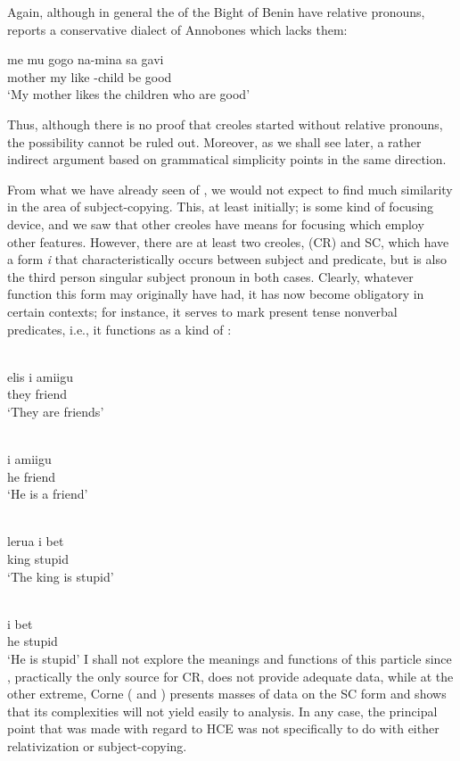 Again, although in general the  of the Bight of Benin have relative pronouns, \citet[97]{Valkoff1966} reports a conserva\-tive dialect of Annobones which lacks them:

\ea\label{ex:2:43}
\gll  me mu gogo na-mina sa gavi \\
mother my like {\PL}-child be good\\
\glt `My mother likes the children who are good'
\z

Thus, although there is no proof that creoles started without relative pronouns, the possibility cannot be ruled out. Moreover, as we shall see later, a rather indirect argument based on grammatical sim\-plicity points in the same direction.

From what we have already seen of , we would not expect to find much similarity in the area of subject-copying. This, at least initially; is some kind of focusing device, and we saw that other creoles have means for focusing which employ other features. However, there are at least two creoles,  (CR) and SC, which have a form \textit{i} that characteristically occurs between subject and predicate, but is also the third person singular subject pronoun in both cases. Clearly, what\-ever function this form may originally have had, it has now become obligatory in certain contexts; for instance, it serves to mark present tense nonverbal predicates, i.e., it functions as a kind of :

\ea\label{ex:2:44}
\langinfo{\langCR}{}{}\\
 \gll elis i amiigu\\
they {\PM} friend\\
\glt `They are friends'
\z

\ea\label{ex:2:45}
\langinfo{\langCR}{}{}\\
 \gll i amiigu\\
he friend\\
\glt `He is a friend'
\z

\ea\label{ex:2:46}
\langinfo{\langSC}{}{}\\
 \gll lerua i bet\\
king {\PM} stupid\\
\glt `The king is stupid'
\z

\ea\label{ex:2:47}
\langinfo{\langSC}{}{}\\
\gll i bet\\
he stupid\\
\glt `He is stupid'
\z
I shall not explore the meanings and functions of this particle since \citet{Wilson1962}, practically the only source for CR, does not provide adequate data, while at the other extreme, Corne (\citeyear{Corne1974-75} and \citeyear{Corne1977}) presents masses of data on the SC form and shows that its complexities will not yield easily to analysis. In any case, the principal point that was made with regard to HCE was not specifically to do with either relativization or subject-copying.


